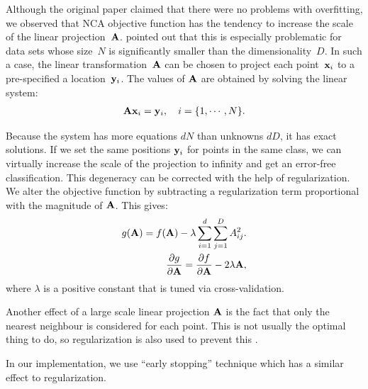   Although the original paper \citep{goldberger2004} claimed that there were no problems with overfitting, we observed that NCA objective function has the tendency to increase the scale of the linear projection~$\mathbf{A}$. \citet{butman2008} pointed out that this is especially problematic for data sets whose size~$N$ is significantly smaller than the dimensionality~$D$. In such a case, the linear transformation~$\mathbf{A}$ can be chosen to project each point~$\mathbf{x}_i$ to a pre-specified a location~$\mathbf{y}_i$. The values of $\mathbf{A}$ are obtained by solving the linear system:
  \begin{align}
    \mathbf{A}\mathbf{x}_i = \mathbf{y}_i, \quad i = \{1,\cdots,N\}.
  \end{align}

  Because the system has more equations $dN$ than unknowns $dD$, it has exact solutions. If we set the same positions $\mathbf{y}_i$ for points in the same class, we can virtually increase the scale of the projection to infinity and get an error-free classification. This degeneracy can be corrected with the help of regularization. We alter the objective function by subtracting a regularization term proportional with the magnitude of $\mathbf{A}$. This gives:
  \begin{align}
    g(\mathbf{A}) = f(\mathbf{A}) - \lambda \sum_{i=1}^d\sum_{j=1}^D A_{ij}^2.\\
            \frac{\partial g}{\partial \mathbf{A}} = \frac{\partial f}{\partial \mathbf{A}} - 2\lambda\mathbf{A},
  \end{align}
  where $\lambda$ is a positive constant that is tuned via cross-validation.

  Another effect of a large scale linear projection $\mathbf{A}$ is the fact that only the nearest neighbour is considered for each point. This is not usually the optimal thing to do, so regularization is also used to prevent this \citep{singh2010}.

  In our implementation, we use ``early stopping'' technique which has a similar effect to regularization. 

%         

